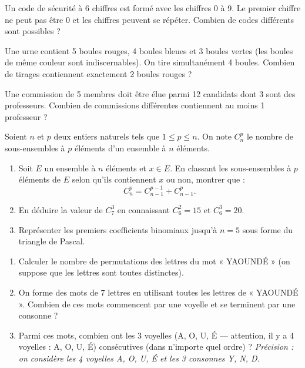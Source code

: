 \documentclass[11pt]{article}
\newcounter{popsec}
\newcounter{popsub}
\newcommand{\courssub}[1]{%
  \stepcounter{popsub}%
  \par\vspace{9pt}\noindent{\popxbold\fontsize{11.5}{13}\selectfont\color{popink}{\color{poporange}\thepopsec.\thepopsub}\hspace{6pt}#1}\par\nopagebreak\vspace{4pt}
}
\begin{document}
\begin{exercice}
Un code de sécurité à 6 chiffres est formé avec les chiffres 0 à 9. Le premier chiffre ne peut pas être 0 et les chiffres peuvent se répéter. Combien de codes différents sont possibles ?
\end{exercice}

\begin{exercice}
Une urne contient 5 boules rouges, 4 boules bleues et 3 boules vertes (les boules de même couleur sont indiscernables). On tire simultanément 4 boules.
Combien de tirages contiennent exactement 2 boules rouges ?
\end{exercice}

\begin{exercice}
Une commission de 5 membres doit être élue parmi 12 candidats dont 3 sont des professeurs. Combien de commissions différentes contiennent au moins 1 professeur ?
\end{exercice}

\courssub{Je me prépare au Probatoire}

\begin{exercice}
Soient $n$ et $p$ deux entiers naturels tels que $1 \le p \le n$. On note $C_n^p$ le nombre de sous-ensembles à $p$ éléments d'un ensemble à $n$ éléments.
\begin{enumerate}
    \item Soit $E$ un ensemble à $n$ éléments et $x \in E$. En classant les sous-ensembles à $p$ éléments de $E$ selon qu'ils contiennent $x$ ou non, montrer que :
    \[ C_n^p = C_{n-1}^{p-1} + C_{n-1}^p. \]
    \item En déduire la valeur de $C_7^3$ en connaissant $C_6^2 = 15$ et $C_6^3 = 20$.
    \item Représenter les premiers coefficients binomiaux jusqu'à $n=5$ sous forme du triangle de Pascal.
\end{enumerate}
\end{exercice}

\begin{exercice}
\begin{enumerate}
    \item Calculer le nombre de permutations des lettres du mot « YAOUNDÉ » (on suppose que les lettres sont toutes distinctes).
    \item On forme des mots de 7 lettres en utilisant toutes les lettres de « YAOUNDÉ ». Combien de ces mots commencent par une voyelle et se terminent par une consonne ?
    \item Parmi ces mots, combien ont les 3 voyelles (A, O, U, É — attention, il y a 4 voyelles : A, O, U, É) consécutives (dans n'importe quel ordre) ?
    \textit{Précision : on considère les 4 voyelles A, O, U, É et les 3 consonnes Y, N, D.}
\end{enumerate}
\end{exercice}
\end{document}
